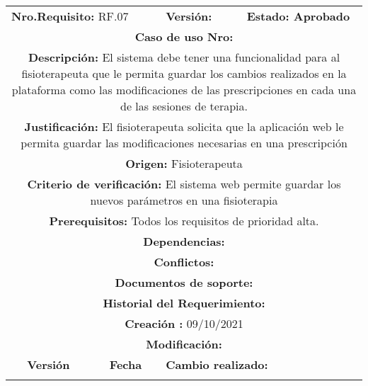 \begin{center}
        
        
        
        
        
        
\begin{tabular}{|c|c|p{4cm}|p{4cm}|}
            \hline
            \rowcolor{red} \multicolumn{4}{|c|}{\textbf{Prioridad:} Alta}  \\
            \hline
            \multicolumn{2}{|l}{\textbf{Nro.Requisito: }RF.07} & \multicolumn{1}{|l}{\textbf{Versión:}} & \multicolumn{1}{|l|}{\textbf{Estado: Aprobado}} \\
            \multicolumn{4}{|p{13cm}|}{\textbf{Caso de uso Nro: }}  \\
            \hline
            \multicolumn{4}{|p{13cm}|}{\textbf{Descripción: } El sistema debe tener una funcionalidad para al fisioterapeuta que le permita guardar los cambios realizados en la plataforma como las modificaciones de las prescripciones en cada una de las sesiones de terapia. } \\
            \multicolumn{4}{|p{13cm}|}{\textbf{Justificación: } El fisioterapeuta solicita que la aplicación web le permita guardar las modificaciones necesarias en una prescripción } \\ 
            \multicolumn{4}{|p{13cm}|}{\textbf{Origen: }Fisioterapeuta}  \\
            \multicolumn{4}{|p{13cm}|}{\textbf{Criterio de verificación: } El sistema web permite guardar los nuevos parámetros en una fisioterapia  } \\
            \hline
            \multicolumn{4}{|p{13cm}|}{\textbf{Prerequisitos: } Todos los requisitos de prioridad alta. }\\
            \hline \multicolumn{4}{|p{12cm}|}{\textbf{Dependencias: }
                }  \\
            \multicolumn{4}{|p{12cm}|}{\textbf{Conflictos: }}  \\
            \hline
            \multicolumn{4}{|p{12cm}|}{\textbf{Documentos de soporte: }}  \\
            \hline
            \multicolumn{4}{|p{12cm}|}{\textbf{Historial del Requerimiento: }}  \\
            \multicolumn{4}{|p{12cm}|}{\textbf{Creación : }09/10/2021}  \\
            \multicolumn{4}{|p{12cm}|}{\textbf{Modificación: }}  \\
             \textbf{Versión} & \textbf{Fecha} & \multicolumn{2}{p{8cm}|}{\textbf{Cambio realizado:}} \\
            \hline
               & &   \multicolumn{2}{p{8cm}|}{}
              \\
            \hline
\end{tabular}        
        



\end{center}

